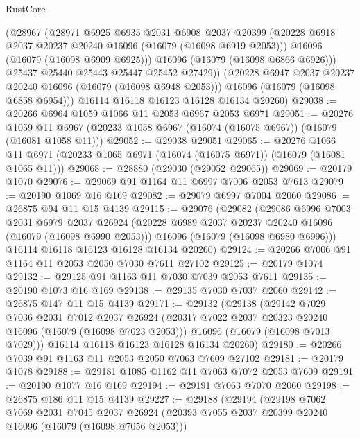 \begin{lexlean}{RustCore}
\begin{coremodule}
            (@28967
              (@28971
                @6925
                @6935
                @2031
                @6908
                @2037
                @20399
                (@20228 @6918 @2037 @20237 @20240 @16096 (@16079 (@16098 @6919 @2053)))
                @16096
                (@16079 (@16098 @6909 @6925)))
              @16096
              (@16079 (@16098 @6866 @6926)))
            @25437
            @25440
            @25443
            @25447
            @25452
            @27429))
        (@20228 @6947 @2037 @20237 @20240 @16096 (@16079 (@16098 @6948 @2053)))
        @16096
        (@16079 (@16098 @6858 @6954)))
      @16114
      @16118
      @16123
      @16128
      @16134
      @20260)
@29038 := @20266 @6964 @1059 @1066 @11 @2053 @6967 @2053 @6971
@29051 := @20276
    @1059
    @11
    @6967
    (@20233 @1058 @6967 (@16074 (@16075 @6967)) (@16079 (@16081 @1058 @11)))
@29052 := @29038 @29051
@29065 := @20276
    @1066
    @11
    @6971
    (@20233 @1065 @6971 (@16074 (@16075 @6971)) (@16079 (@16081 @1065 @11)))
@29068 := @28880 (@29030 (@29052 @29065))
@29069 := @20179 @1070
@29076 := @29069 @91 @1164 @11 @6997 @7006 @2053 @7613
@29079 := @20190 @1069 @16 @169
@29082 := @29079 @6997 @7004 @2060
@29086 := @26875 @94 @11 @15 @4139
@29115 := @29076
    (@29082
      (@29086
        @6996
        @7003
        @2031
        @6979
        @2037
        @26924
        (@20228 @6989 @2037 @20237 @20240 @16096 (@16079 (@16098 @6990 @2053)))
        @16096
        (@16079 (@16098 @6980 @6996)))
      @16114
      @16118
      @16123
      @16128
      @16134
      @20260)
@29124 := @20266 @7006 @91 @1164 @11 @2053 @2050 @7030 @7611 @27102
@29125 := @20179 @1074
@29132 := @29125 @91 @1163 @11 @7030 @7039 @2053 @7611
@29135 := @20190 @1073 @16 @169
@29138 := @29135 @7030 @7037 @2060
@29142 := @26875 @147 @11 @15 @4139
@29171 := @29132
    (@29138
      (@29142
        @7029
        @7036
        @2031
        @7012
        @2037
        @26924
        (@20317 @7022 @2037 @20323 @20240 @16096 (@16079 (@16098 @7023 @2053)))
        @16096
        (@16079 (@16098 @7013 @7029)))
      @16114
      @16118
      @16123
      @16128
      @16134
      @20260)
@29180 := @20266 @7039 @91 @1163 @11 @2053 @2050 @7063 @7609 @27102
@29181 := @20179 @1078
@29188 := @29181 @1085 @1162 @11 @7063 @7072 @2053 @7609
@29191 := @20190 @1077 @16 @169
@29194 := @29191 @7063 @7070 @2060
@29198 := @26875 @186 @11 @15 @4139
@29227 := @29188
    (@29194
      (@29198
        @7062
        @7069
        @2031
        @7045
        @2037
        @26924
        (@20393 @7055 @2037 @20399 @20240 @16096 (@16079 (@16098 @7056 @2053)))

\end{coremodule}
\end{lexlean}
